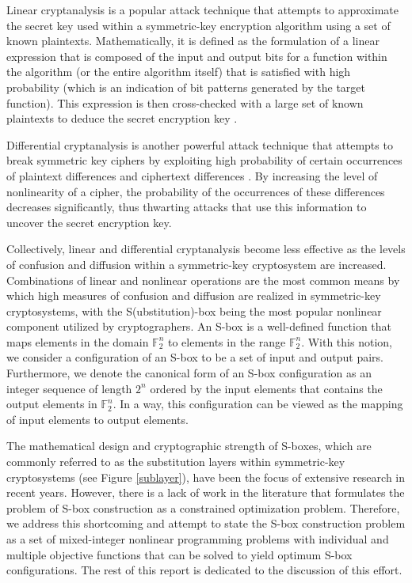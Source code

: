 \documentclass[11pt]{article}
\newcommand{\field}[1]{\mathbb{#1}} %
\begin{document}
Linear cryptanalysis is a popular attack technique that attempts to approximate the secret key used within a symmetric-key encryption algorithm using a set of known plaintexts. Mathematically, it is defined as the formulation of a linear expression that is composed of the input and output bits for a function within the algorithm (or the entire algorithm itself) that is satisfied with high probability (which is an indication of bit patterns generated by the target function). This expression is then cross-checked with a large set of known plaintexts to deduce the secret encryption key \cite{Heys01atutorial}.

Differential cryptanalysis is another powerful attack technique that attempts to break symmetric key ciphers by exploiting high probability of certain occurrences of plaintext differences and ciphertext differences \cite{Heys01atutorial}. By increasing the level of nonlinearity of a cipher, the probability of the occurrences of these differences decreases significantly, thus thwarting attacks that use this information to uncover the secret encryption key. 

Collectively, linear and differential cryptanalysis become less effective as the levels of confusion and diffusion within a symmetric-key cryptosystem are increased. Combinations of linear and nonlinear operations are the most common means by which high measures of confusion and diffusion are realized in symmetric-key cryptosystems, with the S(ubstitution)-box being the most popular nonlinear component utilized by cryptographers. An S-box is a well-defined function that maps elements in the domain $\field{F}_2^n$ to elements in the range $\field{F}_2^n$. With this notion, we consider a configuration of an S-box to be a set of input and output pairs. Furthermore, we denote the canonical form of an S-box configuration as an integer sequence of length $2^n$ ordered by the input elements that contains the output elements in $\field{F}_2^n$. In a way, this configuration can be viewed as the mapping of input elements to output elements.

The mathematical design and cryptographic strength of S-boxes, which are commonly referred to as the substitution layers within symmetric-key cryptosystems (see Figure \ref{sublayer}), have been the focus of extensive research in recent years. However, there is a lack of work in the literature that formulates the problem of S-box construction as a constrained optimization problem. Therefore, we address this shortcoming and attempt to state the S-box construction problem as a set of mixed-integer nonlinear programming problems with individual and multiple objective functions that can be solved to yield optimum S-box configurations. The rest of this report is dedicated to the discussion of this effort.
\end{document}
